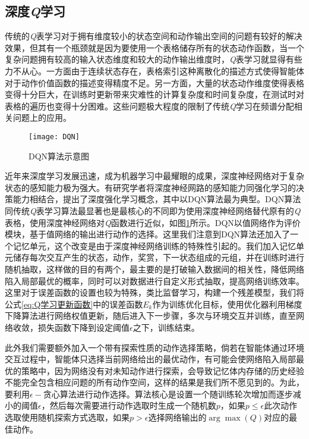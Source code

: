 \subsection{深度\textit{Q}学习}
传统的\textit{Q}表学习对于拥有维度较小的状态空间和动作输出空间的问题有较好的解决效果，但其有一个瓶颈就是因为要使用一个表格储存所有的状态动作函数，当一个复杂问题拥有较高的输入状态维度和较大的动作输出维度时，\textit{Q}表学习就显得有些力不从心。一方面由于连续状态存在，表格索引这种离散化的描述方式使得智能体对于动作价值函数的描述变得精度不足。另一方面，大量的状态动作维度使得表格变得十分巨大，在训练时更新带来灾难性的计算复杂度和时间复杂度，在测试时对表格的遍历也变得十分困难。这些问题极大程度的限制了传统\textit{Q}学习在频谱分配相关问题上的应用。
\begin{figure}[h]
	\centering
	\texttt{[image: DQN]}
	\caption{DQN算法示意图}
	\label{fig:DQN}
\end{figure}

近年来深度学习发展迅速，成为机器学习中最耀眼的成果，深度神经网络对于复杂状态的感知能力极为强大。有研究学者将深度神经网路的感知能力同强化学习的决策能力相结合，提出了深度强化学习\cite{mnih2013playing}概念，其中以DQN算法最为典型。DQN算法同传统\textit{Q}表学习算法最显著也是最核心的不同即为使用深度神经网络替代原有的\textit{Q}表格，使用深度神经网络对\textit{Q}函数进行近似，如图\ref{fig:DQN}所示。DQN以值网络作为评价模块，基于值网络的输出进行动作的选择。这里我们注意到DQN算法还加入了一个记忆单元，这个改变是由于深度神经网络训练的特殊性引起的。我们加入记忆单元储存每次交互产生的状态，动作，奖赏，下一状态组成的元组，并在训练时进行随机抽取，这样做的目的有两个，最主要的是打破输入数据间的相关性，降低网络陷入局部最优的概率，同时可以对数据进行自定义形式抽取，提高网络训练效率。这里对于误差函数的设置也较为特殊，类比监督学习，构建一个残差模型，我们将公式\ref{eq:Q学习更新函数}中的误差函数$E_{k}$作为训练优化目标，使用优化器利用梯度下降算法进行网络权值更新，随后进入下一步骤，多次与环境交互并训练，直至网络收敛，损失函数下降到设定阈值$\epsilon$之下，训练结束。

此外我们需要额外加入一个带有探索性质的动作选择策略，倘若在智能体通过环境交互过程中，智能体只选择当前网络给出的最优动作，有可能会使网络陷入局部最优的策略中，因为网络没有对未知动作进行探索，会导致记忆体内存储的历史经验不能完全包含相应问题的所有动作空间，这样的结果是我们所不愿见到的。为此，要利用$\epsilon-$贪心算法进行动作选择。算法核心是设置一个随训练轮次增加而逐步减小的阈值$\epsilon$，然后每次需要进行动作选取时生成一个随机数$p$，如果$p\leqslant \epsilon$此次动作选取使用随机探索方式选取，如果$p> \epsilon$选择网络输出的$\arg \max \left ( Q \right )$对应的最佳动作。

